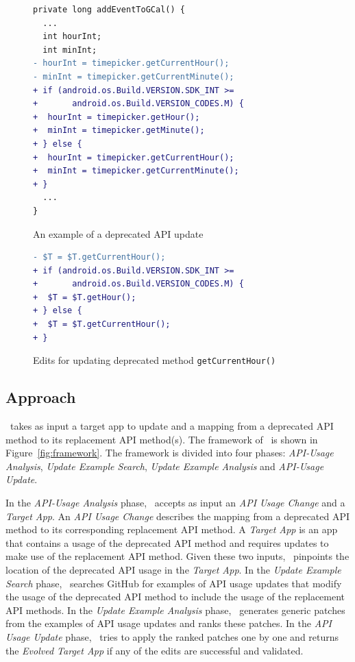 \begin{figure}[htb]
\centering
\begin{lstlisting}[language=diff,numbers=none]
private long addEventToGCal() {
  ...
  int hourInt;
  int minInt;
- hourInt = timepicker.getCurrentHour();
- minInt = timepicker.getCurrentMinute();
+ if (android.os.Build.VERSION.SDK_INT >= 
+       android.os.Build.VERSION_CODES.M) {
+  hourInt = timepicker.getHour();
+  minInt = timepicker.getMinute();
+ } else {
+  hourInt = timepicker.getCurrentHour();
+  minInt = timepicker.getCurrentMinute();
+ }
  ...
}
\end{lstlisting}
\caption{An example of a deprecated API update}
\label{fig:deprecated_api_update_example}
\end{figure}

\begin{figure}[htb]
\centering
\begin{lstlisting}[language=diff,numbers=none]
- $T = $T.getCurrentHour();
+ if (android.os.Build.VERSION.SDK_INT >= 
+       android.os.Build.VERSION_CODES.M) {
+  $T = $T.getHour();
+ } else {
+  $T = $T.getCurrentHour();
+ }
\end{lstlisting}
\caption{Edits for updating deprecated method \texttt{getCurrentHour()}}
\label{fig:deprecated_api_update_edits}
\end{figure}

\subsection{Approach}
\toolname\ takes as input a target app to update and a mapping from a deprecated API method to its replacement API method(s). The framework of \toolname\ is shown in Figure~\ref{fig:framework}. The framework is divided into four phases: {\em API-Usage Analysis}, {\em Update Example Search}, {\em Update Example Analysis} and {\em API-Usage Update}. 

In the {\em API-Usage Analysis} phase, \toolname\ accepts as input an {\em API Usage Change} and a {\em Target App}. An {\em API Usage Change} describes the mapping from a deprecated API method to its corresponding replacement API method. A {\em Target App} is an app that contains a usage of the deprecated API method  and requires updates to make use of the replacement API method. Given these two inputs, \toolname\ pinpoints the location of the deprecated API usage in the {\em Target App}. In the {\em Update Example Search} phase, \toolname\ searches GitHub for examples of API usage updates that modify the usage of the deprecated API method to include the usage of the replacement API methods. In the {\em Update Example Analysis} phase, \toolname\ generates generic patches from the examples of API usage updates and ranks these patches. In the {\em API Usage Update} phase, \toolname\ tries to apply the ranked patches one by one and returns the {\em Evolved Target App} if any of the edits are successful and validated.


